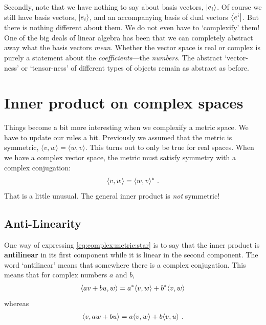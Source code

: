 \documentclass[12pt, oneside]{report}    %
\let\oldsection\section
\def\section{%
  \setcounter{sidenote}{1}%
  \oldsection
}
\begin{document}
Secondly, note that we have nothing to say about basis vectors, $\left|e_i\right\rangle$. Of course we still have basis vectors, $\left|e_i\right\rangle$, and an accompanying basis of dual vectors $\left\langle e^i\right|$. But there is nothing different about them. We do not even have to `complexify' them! One of the big deals of linear algebra has been that we can completely abstract away what the basis vectors \emph{mean}. Whether the vector space is real or complex is purely a statement about the \emph{coefficients}---the \emph{numbers}. The abstract `vector-ness' or `tensor-ness' of different types of objects remain as abstract as before.



\section{Inner product on complex spaces}

Things become a bit more interesting when we complexify a metric space. We have to update our rules a bit. Previously we assumed that the metric is symmetric, $\langle v, w\rangle = \langle w, v\rangle$. This turns out to only be true for real spaces. When we have a complex vector space, the metric must satisfy symmetry with a complex conjugation:
\begin{align}
    \langle v, w \rangle = \langle w, v \rangle^* \ .
    \label{eq:complex:metric:star}
\end{align}
That is a little unusual. The general inner product is \emph{not} symmetric!

\subsection{Anti-Linearity}

One way of expressing \eqref{eq:complex:metric:star} is to say that the inner product is \textbf{antilinear} in its first component while it is linear in the second component. The word `antilinear' means that somewhere there is a complex conjugation. This means that for complex numbers $a$ and $b$,
\begin{align}
    \langle av + bu, w \rangle = 
    a^* \langle v, w\rangle
    +
    b^* \langle v, w\rangle
\end{align}
whereas 
\begin{align}
    \langle v, aw + bu \rangle = 
    a \langle v, w\rangle
    +
    b \langle v, u\rangle \ .
\end{align}
\end{document}
